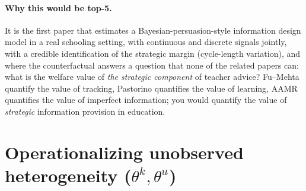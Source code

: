 \documentclass{article}
\begin{document}
\paragraph{Why this would be top-5.}  It is the first paper that estimates a
Bayesian-persuasion-style information design model in a real schooling
setting, with continuous and discrete signals jointly, with a credible
identification of the strategic margin (cycle-length variation), and where the
counterfactual answers a question that none of the related papers can: what is
the welfare value of \emph{the strategic component} of teacher advice? Fu--Mehta
quantify the value of tracking, Pastorino quantifies the value of learning,
AAMR quantifies the value of imperfect information; you would quantify the
value of \emph{strategic} information provision in education.

\section{Operationalizing unobserved heterogeneity ($\theta^k, \theta^u$)}
\end{document}
